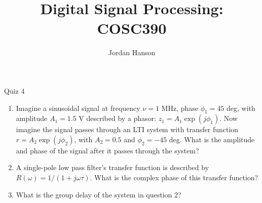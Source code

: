 \documentclass{beamer}
\title{Digital Signal Processing: COSC390}
\author{Jordan Hanson}
\institute{Whittier College Department of Physics and Astronomy}
\begin{document}
\maketitle

\begin{frame}{Quiz 4}
\small
\begin{enumerate}
\item Imagine a sinusoidal signal at frequency $\nu = 1$ MHz, phase $\phi_1 = 45$ deg, with amplitude $A_1 = 1.5$ V described by a phasor: $z_1 = A_1\exp(j\phi_1)$.  Now imagine the signal passes through an LTI system with transfer function $r = A_2\exp(j\phi_2)$, with $A_2 = 0.5$ and $\phi_2 = -45$ deg.  What is the amplitude and phase of the signal after it passes through the system?
\item A single-pole low pass filter's transfer function is described by $R(\omega) = 1/(1+j\omega\tau)$.  What is the complex phase of this transfer function?
\item What is the group delay of the system in question 2? 
\end{enumerate}
\end{frame}
\end{document}
